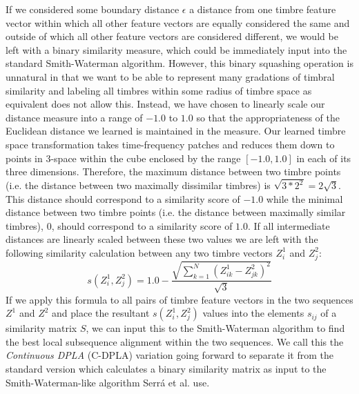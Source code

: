 \documentclass[a4paper,12pt]{report} 	%
\numberwithin{figure}{chapter}
\numberwithin{table}{chapter}
\numberwithin{equation}{chapter}
\begin{document}
\begin{flushleft}
If we considered some boundary distance $\epsilon$ a distance from one timbre feature vector within which all other feature vectors are equally considered the same and outside of which all other feature vectors are considered different, we would be left with a binary similarity measure, which could be immediately input into the standard Smith-Waterman algorithm. However, this binary squashing operation is unnatural in that we want to be able to represent many gradations of timbral similarity and labeling all timbres within some radius of timbre space as equivalent does not allow this. Instead, we have chosen to linearly scale our distance measure into a range of $-1.0$ to $1.0$ so that the appropriateness of the Euclidean distance we learned is maintained in the measure. Our learned timbre space transformation takes time-frequency patches and reduces them down to points in 3-space within the cube enclosed by the range $[-1.0,1.0]$ in each of its three dimensions. Therefore, the maximum distance between two timbre points (i.e. the distance between two maximally dissimilar timbres) is $\sqrt{3*2^2} = 2\sqrt{3}$. This distance should correspond to a similarity score of $-1.0$ while the minimal distance between two timbre points (i.e. the distance between maximally similar timbres), $0$, should correspond to a similarity score of $1.0$. If all intermediate distances are linearly scaled between these two values we are left with the following similarity calculation between any two timbre vectors $Z_i^1$ and $Z_j^2$:
\begin{equation}
s(Z_i^1, Z_j^2) = 1.0-\frac{\sqrt{\sum_{k=1}^{N}(Z_{ik}^1 - Z_{jk}^2)^2}}{\sqrt{3}}
\end{equation}
If we apply this formula to all pairs of timbre feature vectors in the two sequences $Z^1$ and $Z^2$ and place the resultant $s(Z_i^1, Z_j^2)$ values into the elements $s_{ij}$ of a similarity matrix $S$, we can input this to the Smith-Waterman algorithm to find the best local subsequence alignment within the two sequences. We call this the \emph{Continuous DPLA} (C-DPLA) variation going forward to separate it from the standard version which calculates a binary similarity matrix as input to the Smith-Waterman-like algorithm Serr\'a et al. use.


\end{flushleft}
\end{document}

